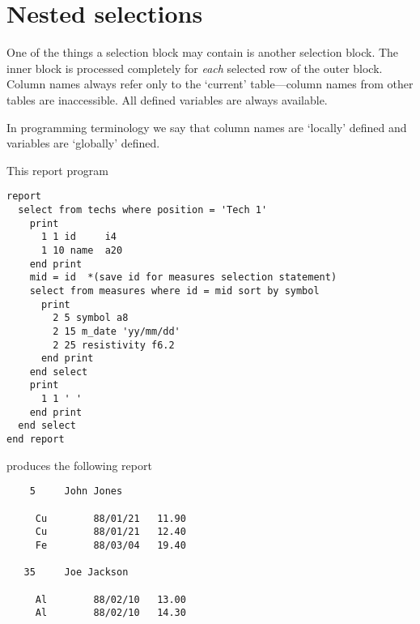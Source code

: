 \documentclass[11pt,a4paper]{report}
\begin{document}
 
\section{Nested selections}
%
One of the things a selection block may contain is another
selection block.
The inner block is processed completely for {\em each} selected
row of the outer block.
Column names always refer only to the `current' table---column
names from other tables are inaccessible.  All defined
variables are always available.
 
 
In programming terminology we say that column names are `locally'
defined and variables are `globally' defined.
 
\demobreak
This report program
\begin{verbatim}
report
  select from techs where position = 'Tech 1'
    print
      1 1 id     i4
      1 10 name  a20
    end print
    mid = id  *(save id for measures selection statement)
    select from measures where id = mid sort by symbol
      print
        2 5 symbol a8
        2 15 m_date 'yy/mm/dd'
        2 25 resistivity f6.2
      end print
    end select
    print
      1 1 ' '
    end print
  end select
end report
\end{verbatim}
\demobreak
produces the following report
 

\begin{verbatim}
    5     John Jones
 
     Cu        88/01/21   11.90
     Cu        88/01/21   12.40
     Fe        88/03/04   19.40
 
   35     Joe Jackson
 
     Al        88/02/10   13.00
     Al        88/02/10   14.30
 
\end{verbatim}
 
\end{document}
